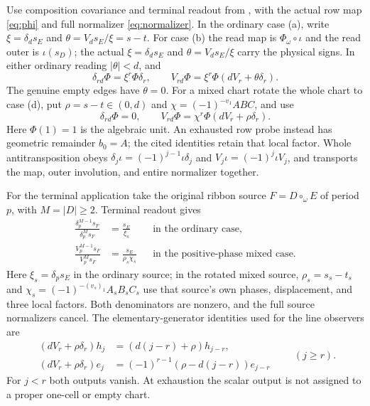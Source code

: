 \documentclass[11pt,a4paper]{amsart}
\numberwithin{equation}{section}
\theoremstyle{plain}
\theoremstyle{definition}
\begin{document}
Use composition covariance and terminal readout from
\cite{Shields2026Readout}, with the actual row map \eqref{eq:phi}
and full normalizer \eqref{eq:normalizer}.  In the ordinary case (a),
write \(\xi=\delta_d s_E\) and \(\theta=V_d s_E/\xi=s-t\).
For case (b) the read map is \(\Phi_\omega\circ\iota\) and the read outer
is \(\iota(s_D)\); the actual \(\xi=\delta_d s_E\) and
\(\theta=V_d s_E/\xi\) carry the physical signs.  In either ordinary
reading \(|\theta|<d\), and
\[
 \delta_{rd}\Phi=\xi^r\Phi\delta_r,\qquad
 V_{rd}\Phi=\xi^r\Phi(dV_r+\theta\delta_r).
\]
The genuine empty edges have \(\theta=0\).
For a mixed chart rotate the whole chart to case (d), put
\(\rho=s-t\in(0,d)\) and \(\chi=(-1)^{-v_1}ABC\), and use
\[
 \delta_{rd}\Phi=0,\qquad
 V_{rd}\Phi=\chi^r\Phi(dV_r+\rho\delta_r).
\]
Here \(\Phi(1)=1\) is the algebraic unit.  An exhausted row probe
instead has geometric remainder \(b_0=A\); the cited identities retain
that local factor.  Whole antitransposition obeys
\(\delta_j\iota=(-1)^{j-1}\iota\delta_j\) and
\(V_j\iota=(-1)^j\iota V_j\), and transports the map, outer involution,
and entire normalizer together.

For the terminal application take the original ribbon source
\(F=D\circ_\omega E\) of period \(p\), with \(M=|D|\ge2\).
Terminal readout \cite[Terminal readout]{Shields2026Readout} gives
\[
 \begin{aligned}
 \frac{\delta_p^{M-1}s_F}{\delta_p^M s_F}
   &=\frac{s_E}{\xi_s}&&\text{in the ordinary case},\\
 \frac{V_p^{M-1}s_F}{V_p^M s_F}
   &=\frac{s_E}{\rho_s\chi_s}&&\text{in the positive-phase mixed case}.
 \end{aligned}
\]
Here \(\xi_s=\delta_p s_E\) in the ordinary source; in the rotated
mixed source, \(\rho_s=s_s-t_s\) and
\(\chi_s=(-1)^{-(v_s)_1}A_sB_sC_s\) use that source's own phases,
displacement, and three local factors.
Both denominators are nonzero, and the full source normalizers cancel.
The elementary-generator identities used for the line observers are
\[
 \begin{aligned}
 (dV_r+\rho\delta_r)h_j&=(d(j-r)+\rho)h_{j-r},\\
 (dV_r+\rho\delta_r)e_j&=(-1)^{r-1}(\rho-d(j-r))e_{j-r}
 \end{aligned}
 \qquad(j\ge r).
\]
For \(j<r\) both outputs vanish.  At exhaustion the scalar output is
not assigned to a proper one-cell or empty chart.
\end{document}
